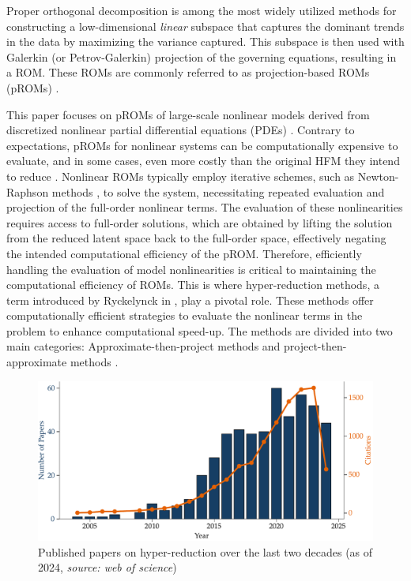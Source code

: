 \documentclass[11pt]{article}
\begin{document}
    Proper orthogonal decomposition \cite{chatterjee2000introductiona,holmes1996turbulence,liang2002proper,cusumano1994experimental,feeny1998on,aubry1991on}  is among the most widely utilized methods for constructing a low-dimensional \textit{linear} subspace that captures the dominant trends in the data by maximizing the variance captured.
    This subspace is then used with Galerkin (or Petrov-Galerkin) projection \cite{carlberg2011efficient,parish2020adjoint,xiao2013non-linear,chen1998petrov--galerkin,grimberg2021mesh} of the governing equations, resulting in a ROM.
    These ROMs are commonly referred to as projection-based ROMs (pROMs) \cite{benner2015survey,hinze2005proper}.




    This paper focuses on pROMs of large-scale nonlinear models derived from discretized nonlinear partial differential equations (PDEs) \cite{quarteroni2008numerical}.
    Contrary to expectations, pROMs for nonlinear systems can be computationally expensive to evaluate, and in some cases, even more costly than the original HFM they intend to reduce \cite{farhat2014dimensional}.
    Nonlinear ROMs typically employ iterative schemes, such as Newton-Raphson methods \cite{ypma1995historical}, to solve the system, necessitating repeated evaluation and projection of the full-order nonlinear terms.
    The evaluation of these nonlinearities requires access to full-order solutions, which are obtained by lifting the solution from the reduced latent space back to the full-order space, effectively negating the intended computational efficiency of the pROM.
    Therefore, efficiently handling the evaluation of model nonlinearities is critical to maintaining the computational efficiency of ROMs.
    This is where hyper-reduction methods, a term introduced by Ryckelynck in \cite{ryckelynck2005priori}, play a pivotal role.
    These methods offer computationally efficient strategies to evaluate the nonlinear terms in the problem to enhance computational speed-up.
    The methods are divided into two main categories: Approximate-then-project methods and project-then-approximate methods \cite{farhat2021_5_bookchapter,grimberg2021mesh}.


    \begin{figure}[t]
        	    \centering
        	    \includegraphics[width=\linewidth]{top10.pdf}
        	    \caption{Published papers on hyper-reduction over the last two decades (as of 2024, \textit{source: web of science})}
        \label{fig:papers}
    \end{figure}
\end{document}
